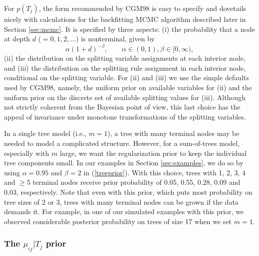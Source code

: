 \documentclass[aoas,nameyear,dvips]{arximspdf}
\begin{document}
For $p(T_j)$, the form recommended by CGM98 is easy to specify and
dovetails nicely with calculations for the backfitting MCMC
algorithm described later in Section \ref{sec:mcmc}.  It is
specified by three aspects: (i) the probability that a node at
depth $d$ ($= 0, 1,2,\ldots$) is nonterminal, given by
\begin{equation}\label{treeprior}
\alpha (1+d)^{-\beta},\qquad
\alpha \in (0,1), \beta \in [0, \infty),
\end{equation}
(ii) the distribution on the splitting variable assignments at
each interior node, and (iii) the distribution on the splitting
rule assignment in each interior node, conditional on the splitting
variable. For (ii) and (iii) we use the simple defaults used by
CGM98, namely, the uniform prior on available variables for (ii)
and the uniform prior on the discrete set of available splitting
values for (iii).  Although not strictly coherent from the
Bayesian point of view, this last choice has the appeal of invariance
under monotone transformations of the splitting variables.

\iffalse
# R calculations for the prior on tree size when alpha=.95,beta=2...
pvec <- .95/(1:4)^2
p1 <- pvec[1]
p2 <- pvec[2]
p3 <- pvec[3]
p4 <- pvec[4]
# depth 1 is .05
# depth 2
p1*(1-p2)^2
# [1] 0.5523359
2*p1*p2*(1-p2)*(1-p3)^2
# [1] 0.2752731
4*p1*p2*p3*(1-p2)*(1-p3)*(1-p4)^2 + p1*p2*p2*(1-p3)^4
# [1] 0.09178265
# remainder
1-.05-0.5523359-0.2752731-0.09178265
# [1] 0.03060835
\fi

In a single tree model (i.e., $m =1$), a tree with many terminal
nodes may be needed to model a complicated structure.  However, for
a sum-of-trees model, especially with $m$ large, we want the
regularization prior to keep the individual tree components small.
In our examples in Section \ref{sec:examples}, we do so by using
$\alpha=0.95$ and $\beta=2$ in (\ref{treeprior}). With this choice,
trees with 1, 2, 3, 4 and $\geq $5 terminal nodes receive prior
probability of 0.05, 0.55, 0.28, 0.09 and 0.03, respectively.
Note that even with this prior, which puts most probability on
tree sizes of 2 or 3, trees with many terminal nodes can
be grown if the data demands it.  For example, in one of our
simulated examples with this prior, we observed considerable
posterior probability on trees of size 17 when we set $m=1$.

\subsubsection{The $\mu_{ij} | T_j$ prior}\label{sec:mprior}
\end{document}
